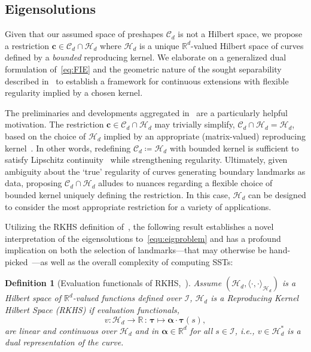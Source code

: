 \documentclass[pdflatex,iicol]{sn-jnl}%
\theoremstyle{thmstyleone}%
\theoremstyle{thmstyletwo}%
\theoremstyle{thmstylethree}%
\newtheorem{definition}{Definition}%
\begin{document}
\subsection{Eigensolutions}\label{sec:e_solns}
Given that our assumed space of preshapes $\mathcal{C}_d$ is not a Hilbert space, we propose a restriction $\boldsymbol{c} \in \mathcal{C}_d \cap \mathcal{H}_d$ where $\mathcal{H}_d$ is a unique $\mathbb{R}^d$-valued Hilbert space of curves defined by a \textit{bounded} reproducing kernel. We elaborate on a generalized dual formulation of~\eqref{eq:FIE} and the geometric nature of the sought separability described in~\cite{grey2023separable} to establish a framework for continuous extensions with flexible regularity implied by a chosen kernel. 

The preliminaries and developments aggregated in~\cite{fiedler2023lipschitz, alpay2021new} are a particularly helpful motivation. The restriction $\boldsymbol{c} \in \mathcal{C}_d \cap \mathcal{H}_d$ may trivially simplify, $\mathcal{C}_d \cap \mathcal{H}_d = \mathcal{H}_d$, based on the choice of $\mathcal{H}_d$ implied by an appropriate (matrix-valued) reproducing kernel~\cite{drake2022implicit}. In other words, redefining $\mathcal{C}_d \coloneqq \mathcal{H}_d$ with bounded kernel is sufficient to satisfy Lipschitz continuity~\cite{fiedler2023lipschitz, alpay2021new} while strengthening regularity. Ultimately, given ambiguity about the `true' regularity of curves generating boundary landmarks as data, proposing $ \mathcal{C}_d \cap \mathcal{H}_d$ alludes to nuances regarding a flexible choice of bounded kernel uniquely defining the restriction. In this case, $\mathcal{H}_d$ can be designed to consider the most appropriate restriction for a variety of applications.

Utilizing the RKHS definition of~\cite{micheli2013matrix}, the following result establishes a novel interpretation of the eigensolutions to~\eqref{equ:eigproblem} and has a profound implication on both the selection of landmarks---that may otherwise be hand-picked~\cite{kendall2009shape}---as well as the overall complexity of computing SSTs:

\begin{definition}[Evaluation functionals of RKHS,~\cite{micheli2013matrix}] \label{def:eval_func}
    Assume $(\mathcal{H}_d, \langle \cdot, \cdot \rangle_{\mathcal{H}_d})$ is a Hilbert space of $\mathbb{R}^d$-valued functions defined over $\mathcal{I}$, $\mathcal{H}_d$ is a Reproducing Kernel Hilbert Space (RKHS) if evaluation functionals,
    $$
    v:\mathcal{H}_d \rightarrow \mathbb{R}\,:\,\boldsymbol{\tau} \mapsto \boldsymbol{\alpha} \cdot \boldsymbol{\tau}(s),
    $$
    are linear and continuous over $\mathcal{H}_d$ and in $\boldsymbol{\alpha}\in \mathbb{R}^d$ for all $s \in \mathcal{I}$, i.e., $v\in \mathcal{H}^*_d$ is a dual representation of the curve.
\end{definition}
\end{document}
